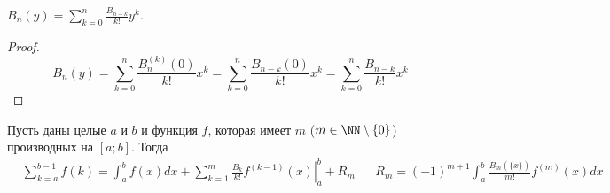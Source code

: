 \documentclass[12pt,a4paper]{article}
\begin{document}
    \begin{corollary}
        $B_n(y) = \sum_{k=0}^n \frac{B_{n-k}}{k!} y^k$.
    \end{corollary}

    \begin{proof}
        \[B_n(y) = \sum_{k=0}^n \frac{B_n^{(k)}(0)}{k!} x^k = \sum_{k=0}^n \frac{B_{n-k}(0)}{k!} x^k = \sum_{k=0}^n \frac{B_{n-k}}{k!} x^k\]
    \end{proof}

    \begin{theorem}
        Пусть даны целые $a$ и $b$ и функция $f$, которая имеет $m$ ($m \in \NN \setminus \{0\}$) производных на $[a; b]$. Тогда
        \begin{align*}
            &\sum_{k=a}^{b-1} f(k) = \int_{a}^b f(x)dx + \sum_{k=1}^m \left.\frac{B_k}{k!} f^{(k-1)}(x)\right|_a^b + R_m&
            &R_m = (-1)^{m+1} \int_a^b \frac{B_m(\{x\})}{m!} f^{(m)}(x)dx
        \end{align*}
    \end{theorem}
\end{document}
